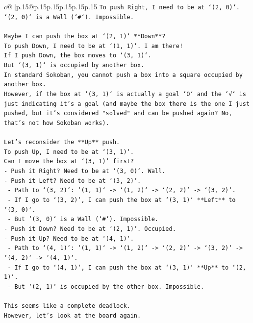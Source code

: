 \documentclass{article}
\begin{document}
{\begin{supertabular}{c@{$\;$}|p{.15\linewidth}@{}p{.15\linewidth}p{.15\linewidth}p{.15\linewidth}p{.15\linewidth}p{.15\linewidth}}
{{{\texttt{To push Right, I need to be at `(2, 0)`. `(2, 0)` is a Wall (`\#`). Impossible.} \\
\\ 
\texttt{Maybe I can push the box at `(2, 1)` **Down**?} \\
\texttt{To push Down, I need to be at `(1, 1)`. I am there!} \\
\texttt{If I push Down, the box moves to `(3, 1)`.} \\
\texttt{But `(3, 1)` is occupied by another box.} \\
\texttt{In standard Sokoban, you cannot push a box into a square occupied by another box.} \\
\texttt{However, if the box at `(3, 1)` is actually a goal `O` and the `√` is just indicating it's a goal (and maybe the box there is the one I just pushed, but it's considered "solved" and can be pushed again? No, that's not how Sokoban works).} \\
\\ 
\texttt{Let's reconsider the **Up** push.} \\
\texttt{To push Up, I need to be at `(3, 1)`.} \\
\texttt{Can I move the box at `(3, 1)` first?} \\
\texttt{{-} Push it Right? Need to be at `(3, 0)`. Wall.} \\
\texttt{{-} Push it Left? Need to be at `(3, 2)`.} \\
\texttt{  {-} Path to `(3, 2)`: `(1, 1)` {-}> `(1, 2)` {-}> `(2, 2)` {-}> `(3, 2)`.} \\
\texttt{  {-} If I go to `(3, 2)`, I can push the box at `(3, 1)` **Left** to `(3, 0)`.} \\
\texttt{  {-} But `(3, 0)` is a Wall (`\#`). Impossible.} \\
\texttt{{-} Push it Down? Need to be at `(2, 1)`. Occupied.} \\
\texttt{{-} Push it Up? Need to be at `(4, 1)`.} \\
\texttt{  {-} Path to `(4, 1)`: `(1, 1)` {-}> `(1, 2)` {-}> `(2, 2)` {-}> `(3, 2)` {-}> `(4, 2)` {-}> `(4, 1)`.} \\
\texttt{  {-} If I go to `(4, 1)`, I can push the box at `(3, 1)` **Up** to `(2, 1)`.} \\
\texttt{  {-} But `(2, 1)` is occupied by the other box. Impossible.} \\
\\ 
\texttt{This seems like a complete deadlock.} \\
\texttt{However, let's look at the board again.} \\
}}}
\end{supertabular}}
\end{document}
